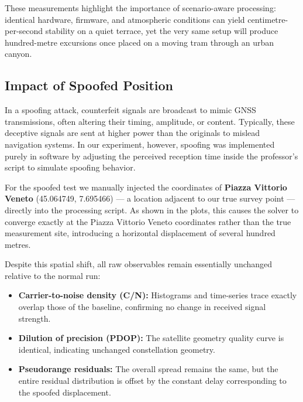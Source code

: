     \medskip
    \noindent
    These measurements highlight the importance of scenario-aware processing: identical hardware,
    firmware, and atmospheric conditions can yield centimetre-per-second stability on a quiet
    terrace, yet the very same setup will produce hundred-metre excursions once placed on a moving
    tram through an urban canyon.

    \subsection{Impact of Spoofed Position}

        In a spoofing attack, counterfeit signals are broadcast to mimic GNSS transmissions, often altering their timing, amplitude, or content. 
        Typically, these deceptive signals are sent at higher power than the originals to mislead navigation systems. 
        In our experiment, however, spoofing was implemented purely in software by adjusting the perceived reception time inside the professor’s script to simulate spoofing behavior.
            
        \noindent For the spoofed test we manually injected the coordinates of \textbf{Piazza Vittorio Veneto} (45.064749, 7.695466) — a location adjacent to our true survey point — directly into the processing script. 
        As shown in the plots, this causes the solver to converge exactly at the Piazza Vittorio Veneto coordinates rather than the true measurement site, introducing a horizontal displacement of several hundred metres.
        
        \noindent Despite this spatial shift, all raw observables remain essentially unchanged relative to the normal run:
        
        \begin{itemize}
            \item \textbf{Carrier-to-noise density (C/N):} Histograms and time-series trace exactly overlap those of the baseline, confirming no change in received signal strength.
            \item \textbf{Dilution of precision (PDOP):} The satellite geometry quality curve is identical, indicating unchanged constellation geometry.
            \item \textbf{Pseudorange residuals:} The overall spread remains the same, but the entire residual distribution is offset by the constant delay corresponding to the spoofed displacement.
        \end{itemize}



